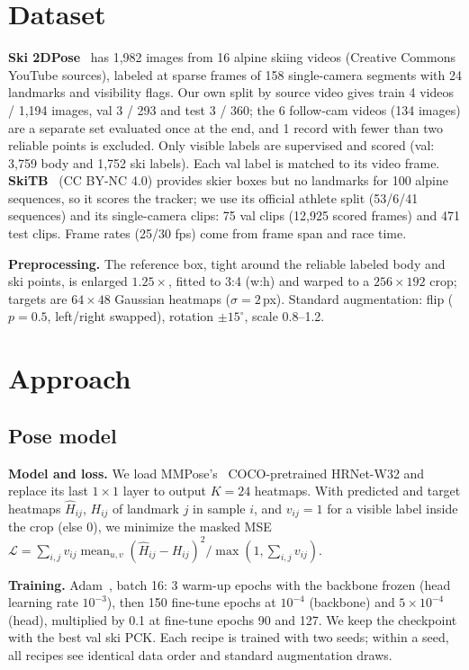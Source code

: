 \documentclass{article}
\begin{document}
\section{Dataset}
\textbf{Ski 2DPose}~\cite{bachmann2019motion} has 1,982 images from 16 alpine skiing videos (Creative Commons YouTube
sources), labeled at sparse frames of 158 single-camera segments with 24 landmarks and visibility flags. Our own split by source video gives train 4 videos / 1,194 images, val 3 / 293 and
test 3 / 360; the 6 follow-cam videos (134 images) are a separate set evaluated once at the
end, and 1 record with fewer than two reliable points is excluded. Only visible labels are supervised and scored
(val: 3,759 body and 1,752 ski labels). Each val label is matched to its video frame.
\textbf{SkiTB}~\cite{dunnhofer2024tracking} (CC BY-NC 4.0) provides
skier boxes but no landmarks for 100 alpine sequences, so it scores the tracker; we use its official athlete split (53/6/41 sequences) and its single-camera
clips: 75 val clips (12,925 scored frames) and 471 test clips. Frame rates (25/30 fps) come from frame span and
race time.

\textbf{Preprocessing.} The reference box, tight around the reliable labeled body and ski points, is enlarged $1.25\times$,
fitted to 3:4 (w:h) and warped to a $256\times192$ crop; targets are $64\times48$ Gaussian heatmaps
($\sigma=2$\,px). Standard augmentation: flip ($p=0.5$, left/right swapped), rotation $\pm15^\circ$,
scale 0.8--1.2.

\section{Approach}\label{sec:approach}
\subsection{Pose model}
\textbf{Model and loss.} We load MMPose's~\cite{mmpose2020} COCO-pretrained HRNet-W32 and replace its last
$1\times1$ layer to output $K=24$ heatmaps. With predicted and target heatmaps $\hat H_{ij}$, $H_{ij}$ of landmark
$j$ in sample $i$, and $v_{ij}=1$ for a visible label inside the crop (else 0), we minimize the masked MSE
$\mathcal{L} = \sum_{i,j} v_{ij} \operatorname{mean}_{u,v}(\hat H_{ij} - H_{ij})^2 / \max(1, \sum_{i,j} v_{ij})$.

\textbf{Training.} Adam~\cite{kingma2015adam}, batch 16: 3 warm-up epochs with the backbone frozen (head learning rate
$10^{-3}$), then 150 fine-tune epochs at $10^{-4}$ (backbone) and $5\times10^{-4}$ (head), multiplied by 0.1 at
fine-tune epochs 90 and 127. We keep the checkpoint with the best val ski PCK. Each recipe is trained with two seeds;
within a seed, all recipes see identical data order and standard augmentation draws.
\end{document}
